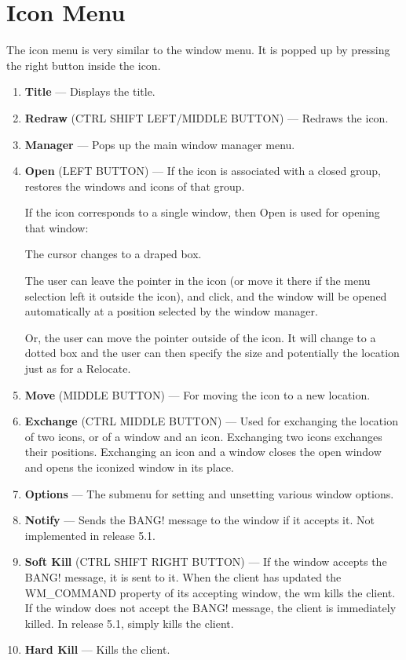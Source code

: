 \section{Icon Menu}

The icon menu is very similar to the window menu.  It is popped up by
pressing the right button inside the icon.

\begin{enumerate}
\item {\bf Title} --- Displays the title.

\item {\bf Redraw} ({\sc CTRL SHIFT LEFT/MIDDLE BUTTON})  --- Redraws the icon.

\item {\bf Manager} --- Pops up the main window manager menu.

\item 
{\bf Open} ({\sc LEFT BUTTON}) --- If the icon is associated with a closed
group, restores the windows and icons of that group.

If the icon corresponds to a single window, then Open is used for opening
that window:

The cursor changes to a draped box.

The user can leave the pointer in the
icon (or move it there if the menu selection left it outside the icon),
and click, and the window will be opened automatically at a position
selected by the window manager.

Or, the user can move the pointer outside of the icon.  It will change to
a dotted box and the user can then specify the size and potentially the
location just as for a Relocate.


\item {\bf Move} ({\sc MIDDLE BUTTON}) --- For moving the icon to a new location.

\item {\bf Exchange} ({\sc CTRL MIDDLE BUTTON}) --- Used for exchanging the
location of two icons, or of a window and an icon.  Exchanging two icons
exchanges their positions.  Exchanging an icon and a window closes the
open window and opens the iconized window in its place.

\item {\bf Options} --- The submenu for setting and unsetting various window
options.

\item {\bf Notify} --- Sends the {\sc BANG!} message to the window if it accepts it.
Not implemented in release 5.1.

\item {\bf Soft Kill} ({\sc CTRL SHIFT RIGHT BUTTON}) ---  If the window accepts
the {\sc BANG!} message, it is sent to it.  When the client has updated the
{\sc WM\_COMMAND} property of its accepting window, the wm kills the client.
If the window does not accept the {\sc BANG!} message, the client is
immediately killed.  In release 5.1, simply kills the client.

\item {\bf Hard Kill} --- Kills the client.
\end{enumerate}

